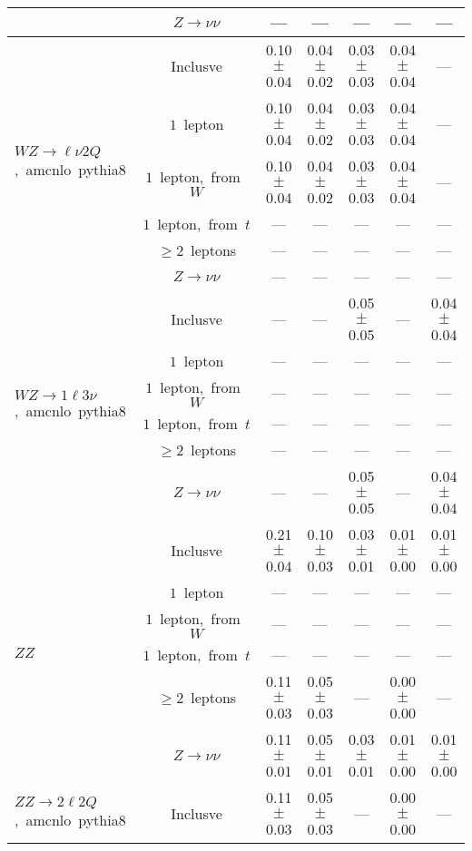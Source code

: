 \documentclass{article}
\begin{document}
\begin{longtable}{|l|c|c|c|c|c|c|}
 & $Z\rightarrow\nu\nu$  & ---  & ---  & ---  & ---  & --- \\* 
\hline 
\multirow{6}{*}{$WZ{\rightarrow}{\ell}{\nu}2Q$,~amcnlo~pythia8} & Inclusve  & 0.10 $\pm$ 0.04  & 0.04 $\pm$ 0.02  & 0.03 $\pm$ 0.03  & 0.04 $\pm$ 0.04  & --- \\* 
 & $1$~lepton  & 0.10 $\pm$ 0.04  & 0.04 $\pm$ 0.02  & 0.03 $\pm$ 0.03  & 0.04 $\pm$ 0.04  & --- \\* 
 & $1$~lepton,~from~$W$  & 0.10 $\pm$ 0.04  & 0.04 $\pm$ 0.02  & 0.03 $\pm$ 0.03  & 0.04 $\pm$ 0.04  & --- \\* 
 & $1$~lepton,~from~$t$  & ---  & ---  & ---  & ---  & --- \\* 
 & $\ge2$~leptons  & ---  & ---  & ---  & ---  & --- \\* 
 & $Z\rightarrow\nu\nu$  & ---  & ---  & ---  & ---  & --- \\* 
\hline 
\multirow{6}{*}{$WZ{\rightarrow}1{\ell}3{\nu}$,~amcnlo~pythia8} & Inclusve  & ---  & ---  & 0.05 $\pm$ 0.05  & ---  & 0.04 $\pm$ 0.04 \\* 
 & $1$~lepton  & ---  & ---  & ---  & ---  & --- \\* 
 & $1$~lepton,~from~$W$  & ---  & ---  & ---  & ---  & --- \\* 
 & $1$~lepton,~from~$t$  & ---  & ---  & ---  & ---  & --- \\* 
 & $\ge2$~leptons  & ---  & ---  & ---  & ---  & --- \\* 
 & $Z\rightarrow\nu\nu$  & ---  & ---  & 0.05 $\pm$ 0.05  & ---  & 0.04 $\pm$ 0.04 \\* 
\hline 
\multirow{6}{*}{$ZZ$} & Inclusve  & 0.21 $\pm$ 0.04  & 0.10 $\pm$ 0.03  & 0.03 $\pm$ 0.01  & 0.01 $\pm$ 0.00  & 0.01 $\pm$ 0.00 \\* 
 & $1$~lepton  & ---  & ---  & ---  & ---  & --- \\* 
 & $1$~lepton,~from~$W$  & ---  & ---  & ---  & ---  & --- \\* 
 & $1$~lepton,~from~$t$  & ---  & ---  & ---  & ---  & --- \\* 
 & $\ge2$~leptons  & 0.11 $\pm$ 0.03  & 0.05 $\pm$ 0.03  & ---  & 0.00 $\pm$ 0.00  & --- \\* 
 & $Z\rightarrow\nu\nu$  & 0.11 $\pm$ 0.01  & 0.05 $\pm$ 0.01  & 0.03 $\pm$ 0.01  & 0.01 $\pm$ 0.00  & 0.01 $\pm$ 0.00 \\* 
\hline 
\multirow{6}{*}{$ZZ{\rightarrow}2{\ell}2Q$,~amcnlo~pythia8} & Inclusve  & 0.11 $\pm$ 0.03  & 0.05 $\pm$ 0.03  & ---  & 0.00 $\pm$ 0.00  & --- \\* 

\end{longtable}
\end{document}
